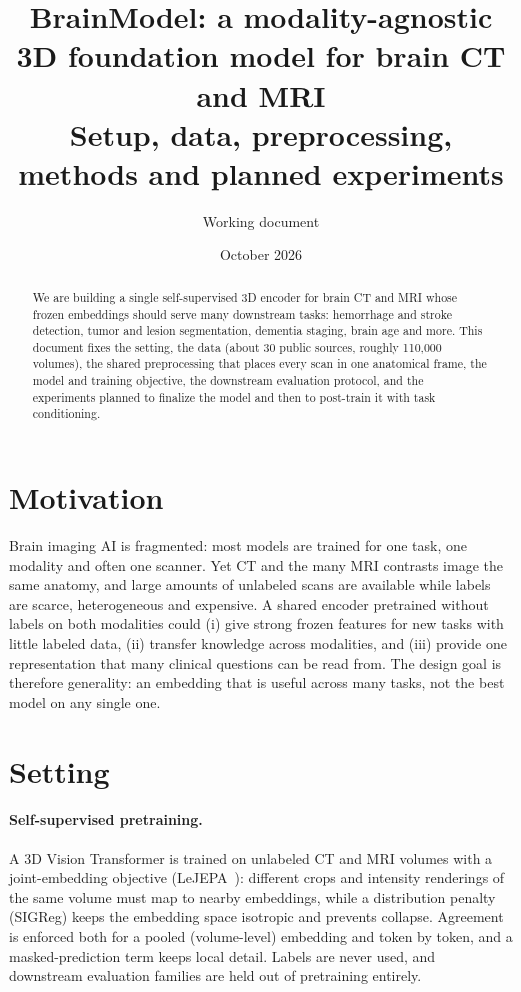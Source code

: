 \documentclass[10pt]{article}
\title{\textbf{BrainModel: a modality-agnostic 3D foundation model for brain CT and MRI}\\[0.3em]
\large Setup, data, preprocessing, methods and planned experiments}
\author{Working document}
\date{October 2026}
\begin{document}
\maketitle

\begin{abstract}
We are building a single self-supervised 3D encoder for brain CT and MRI whose frozen embeddings should serve many
downstream tasks: hemorrhage and stroke detection, tumor and lesion segmentation, dementia staging, brain age and
more. This document fixes the setting, the data (about 30 public sources, roughly 110{,}000 volumes), the shared
preprocessing that places every scan in one anatomical frame, the model and training objective, the downstream
evaluation protocol, and the experiments planned to finalize the model and then to post-train it with task
conditioning.
\end{abstract}

\tableofcontents
\bigskip

\section{Motivation}

Brain imaging AI is fragmented: most models are trained for one task, one modality and often one scanner. Yet CT and
the many MRI contrasts image the same anatomy, and large amounts of unlabeled scans are available while labels are
scarce, heterogeneous and expensive. A shared encoder pretrained without labels on both modalities could (i) give
strong frozen features for new tasks with little labeled data, (ii) transfer knowledge across modalities, and (iii)
provide one representation that many clinical questions can be read from. The design goal is therefore generality:
an embedding that is useful across many tasks, not the best model on any single one.

\section{Setting}

\paragraph{Self-supervised pretraining.} A 3D Vision Transformer is trained on unlabeled CT and MRI volumes with a
joint-embedding objective (LeJEPA~\cite{lejepa}): different crops and intensity renderings of the same volume must map
to nearby embeddings, while a distribution penalty (SIGReg) keeps the embedding space isotropic and prevents collapse.
Agreement is enforced both for a pooled (volume-level) embedding and token by token, and a masked-prediction term
keeps local detail. Labels are never used, and downstream evaluation families are held out of pretraining entirely.
\end{document}

